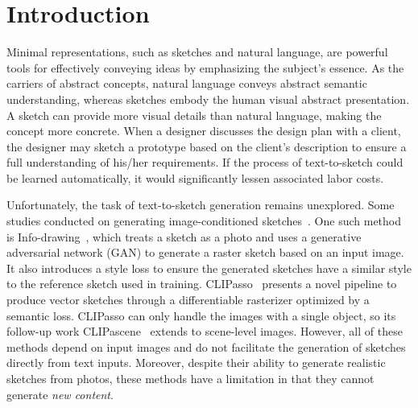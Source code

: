 \documentclass{article}
\begin{document}
\section{Introduction}
Minimal representations, such as sketches and natural language, are powerful tools for effectively conveying ideas by emphasizing the subject's essence. As the carriers of abstract concepts, natural language conveys abstract semantic understanding, whereas sketches embody the human visual abstract presentation. A sketch can provide more visual details than natural language, making the concept more concrete. %
When a designer discusses the design plan with a client, the designer may sketch a prototype based on the client's description to ensure a full understanding of his/her requirements. If the process of text-to-sketch could be learned automatically, it would significantly lessen associated labor costs.



Unfortunately, the task of text-to-sketch generation remains unexplored. Some studies conducted on generating image-conditioned sketches~\cite{infodrawing_Chan_2022,liu2020unsupervised,vinker_2022_clipasso,clipascene_vinker_2022}. One such method is Info-drawing~\cite{infodrawing_Chan_2022}, which treats a sketch as a photo and uses a generative adversarial network (GAN) to generate a raster sketch based on an input image. It also introduces a style loss to ensure the generated sketches have a similar style to the reference sketch used in training. CLIPasso~\cite{vinker_2022_clipasso} presents a novel pipeline to produce vector sketches through a differentiable rasterizer optimized by a semantic loss. CLIPasso can only handle the images with a single object, so its follow-up work CLIPascene~\cite{clipascene_vinker_2022} extends to scene-level images. However, all of these methods depend on input images and do not facilitate the generation of sketches directly from text inputs. 
Moreover, despite their ability to generate realistic sketches from photos, these methods have a limitation in that they cannot generate \textit{new content}.
\end{document}
